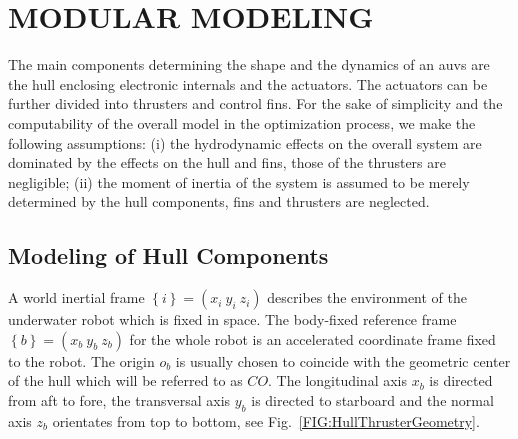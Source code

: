 
\section{MODULAR MODELING}
The main components determining the shape and the dynamics of an \acp{auv} are the hull enclosing electronic internals and the actuators. The actuators can be further divided into thrusters and control fins. For the sake of simplicity and the computability of the overall model in the optimization process, we make the following assumptions:  (i) the hydrodynamic effects on the overall system are dominated by the effects on the hull and fins, those of the thrusters are negligible; (ii) the moment of inertia of the system is assumed to be merely determined by the hull components, fins and thrusters are neglected. 

\subsection{Modeling of Hull Components}
A world inertial frame $\left\{ i \right\}=(x_{i}~y_{i}~z_{i})$ describes the environment of the underwater robot which is fixed in space. The body-fixed reference frame $\left\{ b \right\}=(x_{b}~y_{b}~z_{b})$ for the whole robot is an accelerated coordinate frame fixed to the robot. The origin $o_{b}$ is usually chosen to coincide with the geometric center of the hull which will be referred to as $CO$. The longitudinal axis $x_{b}$ is directed from aft to fore, the transversal axis $y_{b}$ is directed to starboard and the normal axis $z_{b}$ orientates from top to bottom, see Fig.~\ref{FIG:HullThrusterGeometry}.

